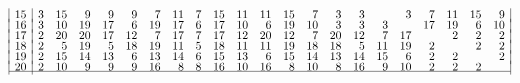 {$$\begin{array}{|r|*{21}{r}|}
15 & 3 & 15 & 9 & 9 & 9 & 7 & 11 & 7 & 15 & 11 & 11 & 15 & 7 & 3 & 3 &  & 3 & 7 & 11 & 15 & 9\\[-3pt]
16 & 3 & 10 & 19 & 17 & 6 & 19 & 17 & 6 & 17 & 10 & 6 & 19 & 10 & 3 & 3 & 3 &  & 17 & 19 & 6 & 10\\[-3pt]
17 & 2 & 20 & 20 & 17 & 12 & 7 & 17 & 7 & 17 & 12 & 20 & 12 & 7 & 20 & 12 & 7 & 17 &  & 2 & 2 & 2\\[-3pt]
18 & 2 & 5 & 19 & 5 & 18 & 19 & 11 & 5 & 18 & 11 & 11 & 19 & 18 & 18 & 5 & 11 & 19 & 2 &  & 2 & 2\\[-3pt]
19 & 2 & 15 & 14 & 13 & 6 & 13 & 14 & 6 & 15 & 13 & 6 & 15 & 14 & 13 & 14 & 15 & 6 & 2 & 2 &  & 2\\[-3pt]
20 & 2 & 10 & 9 & 9 & 9 & 16 & 8 & 8 & 16 & 10 & 16 & 8 & 10 & 8 & 16 & 9 & 10 & 2 & 2 & 2 & \\[-3pt]
\hline
\end{array}
$$
}

